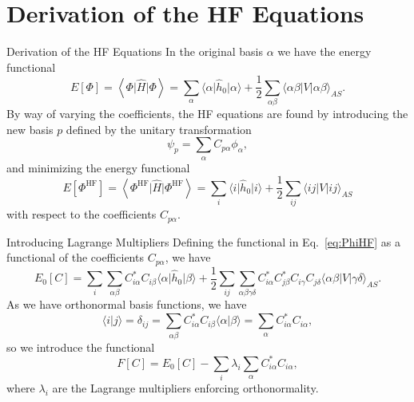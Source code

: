 \documentclass[UKenglish,aspectratio=169]{beamer}
\begin{document}

\appendix
\section{Derivation of the HF Equations}

\begin{frame}{Derivation of the HF Equations}
    In the original basis $\alpha$ we have the energy functional
    \begin{equation}
        E[\Phi]
        = \left\langle \Phi \vert \hat{H} \vert \Phi \right\rangle
        = \sum_{\alpha} \langle \alpha \vert \hat{h}_0 \vert \alpha \rangle
        + \frac{1}{2} \sum_{\alpha\beta} \langle \alpha\beta \vert V
        \vert \alpha \beta \rangle_{AS}.
    \end{equation}
    By way of varying the coefficients, the HF equations are found by
    introducing the new basis $p$ defined by the unitary transformation
    \begin{equation}
        \psi_p = \sum_{\alpha} C_{p\alpha} \phi_\alpha,
    \end{equation}
    and minimizing the energy functional
    \begin{equation}\label{eq:PhiHF}
        E[\Phi^\mathrm{HF}]
        = \left\langle \Phi^\mathrm{HF} \vert \hat{H} \vert
        \Phi^\mathrm{HF} \right\rangle
        = \sum_{i} \langle i \vert \hat{h}_0 \vert i \rangle +
        \frac{1}{2} \sum_{ij} \langle ij \vert V \vert ij \rangle_{AS}
    \end{equation}
    with respect to the coefficients $C_{p\alpha}$.
\end{frame}

\begin{frame}{Introducing Lagrange Multipliers}
    Defining the functional in Eq.~\eqref{eq:PhiHF} as a functional
    of the coefficients $C_{p\alpha}$, we have
    \begin{equation}%
        E_0[C]
        = \sum_{i} \sum_{\alpha\beta} {
            C_{i \alpha}^*
            C_{i \beta}
            \langle \alpha \vert \hat{h}_0 \vert \beta \rangle
        }
        + \frac{1}{2} \sum_{ij} \sum_{\alpha\beta\gamma\delta} {
            C_{i \alpha}^*
            C_{j \beta}^*
            C_{i \gamma}
            C_{j \delta}
            \langle \alpha\beta \vert V \vert \gamma\delta \rangle_{AS}
        }.
    \end{equation}
    As we have orthonormal basis functions, we have
    \begin{equation}
        \langle i \vert j \rangle
        = \delta_{ij}
        = \sum_{\alpha\beta} C_{i\alpha}^* C_{i\beta}
        \langle \alpha \vert \beta \rangle
        = \sum_{\alpha} C_{i\alpha}^* C_{i\alpha},
    \end{equation}
    so we introduce the functional
    \begin{equation}
        F[C] = E_0[C] - \sum_{i} \lambda_i \sum_{\alpha}
        C_{i\alpha}^* C_{i\alpha},
    \end{equation}
    where $\lambda_i$ are the Lagrange multipliers enforcing orthonormality.
\end{frame}
\end{document}
